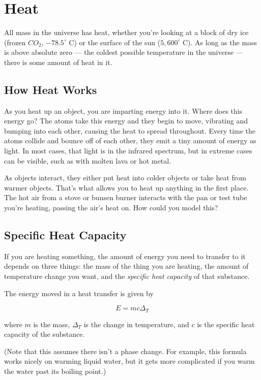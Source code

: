 \chapter{Heat}\label{chap:heat}

All mass in the universe has heat, whether you're looking at a block of dry ice (frozen $CO_2$, $-78.5^\circ$ C)
or the surface of the sun ($5,600^\circ$ C). As long as the mass is above absolute zero --- the coldest possible
temperature in the universe --- there is some amount of heat in it.

\section{How Heat Works}

As you heat up an object, you are imparting energy into it. Where does this energy go? The atoms take this energy
and they begin to move, vibrating and bumping into each other, causing the heat to spread throughout. Every time the
atoms collide and bounce off of each other, they emit a tiny amount of energy as light. In most cases, that light is
in the infrared spectrum, but in extreme cases can be visible, such as with molten lava or hot metal.

As objects interact, they either put heat into colder objects or take heat from warmer objects. That's what allows you to heat up
anything in the first place. The hot air from a stove or bunsen burner interacts with the pan or test tube you're heating,
passing the air's heat on. How could you model this?

\section{Specific Heat Capacity}

If you are heating something, the amount of energy you need to
transfer to it depends on three things: the mass of the thing you are
heating, the amount of temperature change you want, and the
\textit{specific heat capacity} of that substance.

\begin{mdframed}[style=important, frametitle={Energy in Heat Transfer}]

  The energy moved in a heat transfer is given by

  $$E = m c \Delta_T$$

  where $m$ is the mass, $\Delta_T$ is the change in temperature, and
  $c$ is the specific heat capacity of the substance.

  (Note that this
  assumes there isn't a phase change. For example, this formula works nicely on
  warming liquid water, but it gets more complicated if you warm the
  water past its boiling point.)

\end{mdframed}

